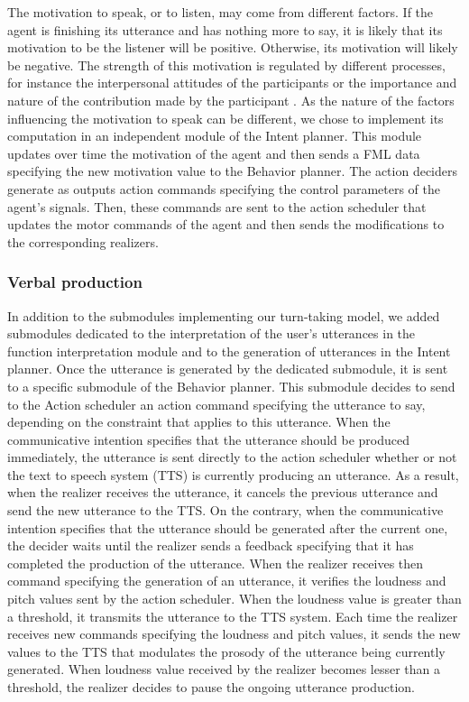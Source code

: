 The motivation to speak, or to listen, may come from different factors. If the agent is finishing its utterance and has nothing more to say, it is likely that its motivation to be the listener will be positive. Otherwise, its motivation will likely be negative. The strength of this motivation is regulated by different processes, for instance the interpersonal attitudes of the participants \citep{ter_maat_how_2010,ravenet_conversational_2015} or the importance and nature of the contribution made by the participant \citep{cafaro_effects_2016}. As the nature of the factors influencing the motivation to speak can be different, we chose to implement its computation in an independent module of the Intent planner. This module updates over time the motivation of the agent and then sends a FML data specifying the new motivation value to the Behavior planner. 
The action deciders generate as outputs action commands specifying the control parameters of the agent's signals. Then, these commands are sent to the action scheduler that updates the motor commands of the agent and then sends the modifications to the corresponding realizers.

\subsubsection{Verbal production}

In addition to the submodules implementing our turn-taking model, we added submodules dedicated to the interpretation of the user's utterances in the function interpretation module and to the generation of utterances in the Intent planner. 
Once the utterance is generated by the dedicated submodule, it is sent to a specific submodule of the Behavior planner. This submodule decides to send to the Action scheduler an action command specifying the utterance to say, depending on the constraint that applies to this utterance. When the communicative intention specifies that the utterance should be produced immediately, the utterance is sent directly to the action scheduler whether or not the text to speech system (TTS) is currently producing an utterance. As a result, when the realizer receives the utterance, it cancels the previous utterance and send the new utterance to the TTS. On the contrary, when the communicative intention specifies that the utterance should be generated after the current one, the decider waits until the realizer sends a feedback specifying that it has completed the production of the utterance.
When the realizer receives then command specifying the generation of an utterance, it verifies the loudness and pitch values sent by the action scheduler. When the loudness value is greater than a threshold, it transmits the utterance to the TTS system. Each time the realizer receives new commands specifying the loudness and pitch values, it sends the new values to the TTS that modulates the prosody of the utterance being currently generated. When loudness value received by the realizer becomes lesser than a threshold, the realizer decides to pause the ongoing utterance production.

